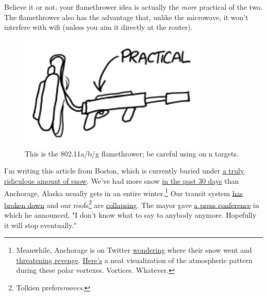 {\hfill{}

{Believe it or not, your flamethrower idea is actually the \emph{more} practical of the two. The flamethrower also has the advantage that, unlike the microwave, it won't interfere with wifi (unless you aim it directly at the router).}

\begin{figure}[!htbp]
\centering
\includegraphics[scale=0.5, max width=0.8\textwidth]{imgs/a/130/flamethrower.png}
\caption{This is the 802.11a/b/g flamethrower; be careful using on n targets.}
\end{figure}

{I'm writing this article from Boston, which is currently buried under \href{http://www.buzzfeed.com/mjs538/please-stop-snowing}{a truly ridiculous amount of snow}. We've had more snow \href{http://weather.ou.edu/\~splillo/misc.html}{in the past 30 days} than Anchorage, Alaska usually gets in an entire winter.{\footnote{Meanwhile, Anchorage is on Twitter \href{https://twitter.com/NWSBoston/status/567172928593485824}{wondering} where their snow went and \href{https://twitter.com/NWSAnchorage/status/567566488517619712}{threatening revenge}. \href{https://twitter.com/EricHolthaus/status/567350490912931840}{Here's} a neat visualization of the atmospheric pattern during these polar vortexes. Vortices. Whatever.} } Our transit system \href{http://www.bostonglobe.com/metro/2015/02/14/transportation/U7vNqP861gKQFRly2jmjdL/story.html}{has broken down} and our roofs{\footnote{Tolkien prefers\emph{rooves}.} } are \href{http://www.whdh.com/story/28133433/dozens-of-roof-collapses-reported-across-new-england}{collapsing}. The mayor gave \href{http://www.boston.com/news/local/massachusetts/2015/02/15/boston-mayor-seems-pretty-tired-all-this-dang-snow/OYtAnLLNQ2iMBMRaxTJYzJ/story.html?s\_campaign=bcom\%3Asocialflow\%3Atwitter}{a press conference} in which he announced, "I don't know what to say to anybody anymore. Hopefully it will stop eventually."}

}

